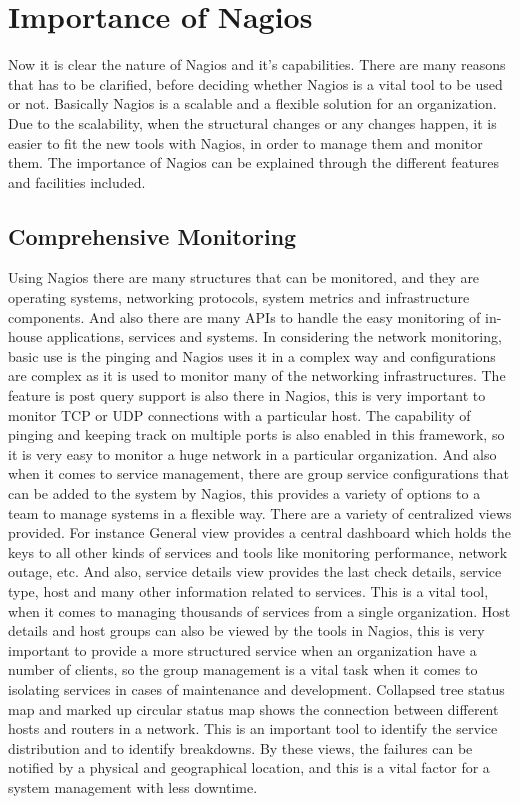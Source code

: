 \documentclass[9pt,twocolumn,twoside]{styles/osajnl}
\begin{document}
\section{Importance of Nagios}

Now it is clear the nature of Nagios and it's capabilities. There are
many reasons that has to be clarified, before deciding whether Nagios
is a vital tool to be used or not. Basically Nagios is a scalable and
a flexible solution for an organization. Due to the scalability, when
the structural changes or any changes happen, it is easier to fit the
new tools with Nagios, in order to manage them and monitor them. The
importance of Nagios can be explained through the different features
and facilities included.

\subsection{Comprehensive Monitoring}

Using Nagios there are many structures that can be monitored, and they
are operating systems, networking protocols, system metrics and
infrastructure components. And also there are many APIs to handle the
easy monitoring of in-house applications, services and systems. In
considering the network monitoring, basic use is the pinging and
Nagios uses it in a complex way and configurations are complex as it
is used to monitor many of the networking infrastructures. The feature
is post query support is also there in Nagios, this is very important
to monitor TCP or UDP connections with a particular host. The
capability of pinging and keeping track on multiple ports is also
enabled in this framework, so it is very easy to monitor a huge
network in a particular organization. And also when it comes to
service management, there are group service configurations that can be
added to the system by Nagios, this provides a variety of options to a
team to manage systems in a flexible way. There are a variety of
centralized views provided. For instance General view provides a
central dashboard which holds the keys to all other kinds of services
and tools like monitoring performance, network outage, etc. And also,
service details view provides the last check details, service type,
host and many other information related to services. This is a vital
tool, when it comes to managing thousands of services from a single
organization. Host details and host groups can also be viewed by the
tools in Nagios, this is very important to provide a more structured
service when an organization have a number of clients, so the group
management is a vital task when it comes to isolating services in
cases of maintenance and development. Collapsed tree status map and
marked up circular status map shows the connection between different
hosts and routers in a network. This is an important tool to identify
the service distribution and to identify breakdowns. By these views,
the failures can be notified by a physical and geographical location,
and this is a vital factor for a system management with less downtime.
\end{document}
